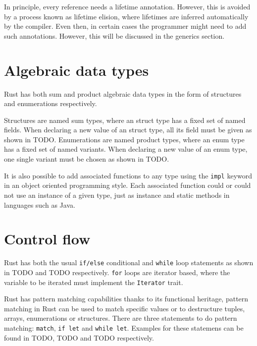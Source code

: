 In principle, every reference needs a lifetime annotation. However, this is avoided by a process known as lifetime elision, where lifetimes are inferred automatically by the compiler. Even then, in certain cases the programmer might need to add such annotations. However, this will be discussed in the generics section.

\section{Algebraic data types}
Rust has both sum and product algebraic data types in the form of structures and enumerations respectively.

Structures are named sum types, where an struct type has a fixed set of named fields. When declaring a new value of an struct type, all its field must be given as shown in TODO. Enumerations are named product types, where an enum type has a fixed set of named variants. When declaring a new value of an enum type, one single variant must be chosen as shown in TODO.

It is also possible to add associated functions to any type using the \texttt{impl} keyword in an object oriented programming style. Each associated function could or could not use an instance of a given type, just as instance and static methods in languages such as Java.

\section{Control flow}
Rust has both the usual \texttt{if/else} conditional and \texttt{while} loop statements as shown in TODO and TODO respectively. \texttt{for} loops are iterator based, where the variable to be iterated must implement the \texttt{Iterator} trait.

Rust has pattern matching capabilities thanks to its functional heritage, pattern matching in Rust can be used to match specific values or to destructure tuples, arrays, enumerations or structures. There are three statements to do pattern matching: \texttt{match}, \texttt{if let} and \texttt{while let}. Examples for these statemens can be found in TODO, TODO and TODO respectively. 

